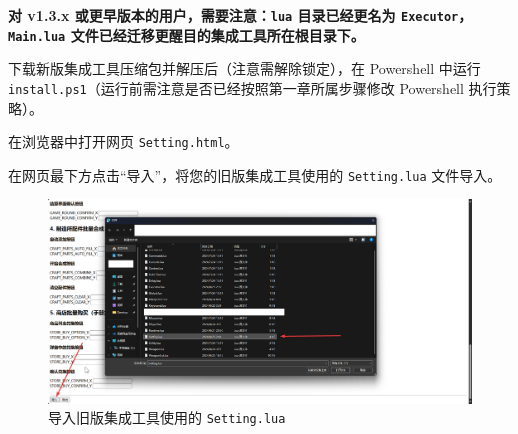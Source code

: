 






\textbf{\color{red}对 v1.3.x 或更早版本的用户，需要注意：\lstinline{lua} 目录已经更名为 \lstinline{Executor}，\lstinline{Main.lua} 文件已经迁移更醒目的集成工具所在根目录下。}

下载新版集成工具压缩包并解压后（注意需解除锁定），在 Powershell 中运行 \lstinline{install.ps1}（运行前需注意是否已经按照第一章所属步骤修改 Powershell 执行策略）。

在浏览器中打开网页 \lstinline{Setting.html}。

在网页最下方点击“导入”，将您的旧版集成工具使用的 \lstinline{Setting.lua} 文件导入。

\begin{figure}[H]
    \Centering
    \includegraphics[width=\textwidth]{docs/assets/update/import_setting}
    \caption{导入旧版集成工具使用的 \lstinline{Setting.lua}}
\end{figure}

